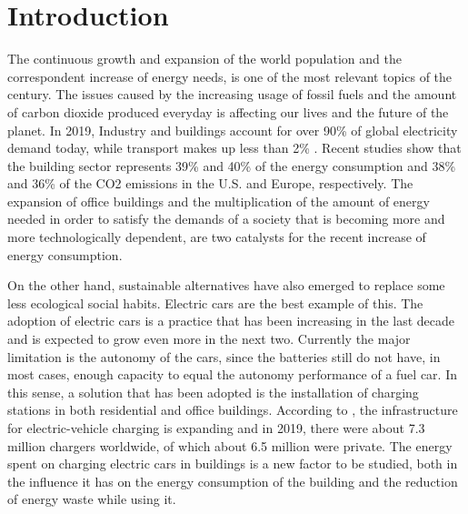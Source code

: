 \chapter{Introduction}
\label{chap:intro}

The continuous growth and expansion of the world population and the correspondent increase of energy needs, is one of the most relevant topics of the century. The issues caused by the increasing usage of fossil fuels and the amount of carbon dioxide produced everyday is affecting our lives and the future of the planet. In 2019, Industry and buildings account for over 90\% of global electricity demand today, while transport makes up less than 2\% \cite{iea}. Recent studies show that the building sector represents 39\% and 40\% of the energy consumption and 38\% and 36\% of the CO2 emissions in the U.S. \cite{CivilUS} and Europe\cite{CivilEU}, respectively. The expansion of office buildings and the multiplication of the amount of energy needed in order to satisfy the demands of a society that is becoming more and more technologically dependent, are two catalysts for the recent increase of energy consumption. 



On the other hand, sustainable alternatives have also emerged to replace some less ecological social habits. Electric cars are the best example of this. The adoption of electric cars is a practice that has been increasing in the last decade and is expected to grow even more in the next two. Currently the major limitation is the autonomy of the cars, since the batteries still do not have, in most cases, enough capacity to equal the autonomy performance of a fuel car. In this sense, a solution that has been adopted is the installation of charging stations in both residential and office buildings. According to \cite{charger}, the infrastructure for electric-vehicle charging is expanding and in 2019, there were about 7.3 million chargers worldwide, of which about 6.5 million were private. The energy spent on charging electric cars in buildings is a new factor to be studied, both in the influence it has on the energy consumption of the building and the reduction of energy waste while using it.


